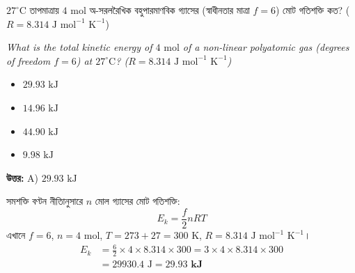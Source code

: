 \documentclass[12pt, a4paper]{article}
\begin{document}
\vspace{2em}

\begin{tcolorbox}[questionbox={প্রশ্ন (Question) 18}]
    \noindent
    $27^\circ\text{C}$ তাপমাত্রায় $4\text{ mol}$ অ-সরলরৈখিক বহুপারমাণবিক গ্যাসের (স্বাধীনতার মাত্রা $f = 6$) মোট গতিশক্তি কত? ($R = 8.314\text{ J mol}^{-1}\text{ K}^{-1}$)
    
    \vspace{0.8em}
    \begin{english}
    \noindent\textit{\color{darkgray}
    What is the total kinetic energy of $4\text{ mol}$ of a non-linear polyatomic gas (degrees of freedom $f = 6$) at $27^\circ\text{C}$? ($R = 8.314\text{ J mol}^{-1}\text{ K}^{-1}$)
    }
    \end{english}
\end{tcolorbox}

\begin{itemize}[label={}, leftmargin=1cm, itemsep=0.5em]
    \item[\textbf{A)}] $29.93\text{ kJ}$
    \item[\textbf{B)}] $14.96\text{ kJ}$
    \item[\textbf{C)}] $44.90\text{ kJ}$
    \item[\textbf{D)}] $9.98\text{ kJ}$
\end{itemize}

\vspace{0.5em}
\begin{tcolorbox}[answerbox]
    \textbf{\color{success} উত্তর:} A) $29.93\text{ kJ}$
\end{tcolorbox}
\vspace{1em}

\begin{tcolorbox}[solutionbox={সমাধান (Solution)}]
    \noindent
    সমশক্তি বণ্টন নীতিানুসারে $n$ মোল গ্যাসের মোট গতিশক্তি:
    \[ E_k = \frac{f}{2} n R T \]
    এখানে $f = 6$, $n = 4\text{ mol}$, $T = 273 + 27 = 300\text{ K}$, $R = 8.314\text{ J mol}^{-1}\text{ K}^{-1}$।
    \begin{align*}
        E_k &= \frac{6}{2} \times 4 \times 8.314 \times 300 = 3 \times 4 \times 8.314 \times 300 \\
        &= 29930.4\text{ J} = \mathbf{29.93\text{ kJ}}
    \end{align*}
\end{tcolorbox}
\end{document}
